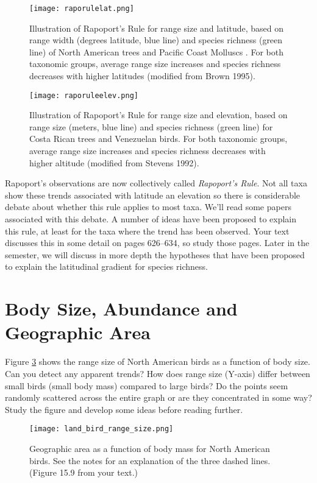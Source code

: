 \documentclass[12pt, oneside]{article}   	%
\begin{document}
\begin{figure}
	\centering
		\texttt{[image: raporulelat.png]}  
		\caption{Illustration of Rapoport's Rule for range size and latitude, based on range width (degrees latitude, blue line) and species richness (green line) of North American trees and Pacific Coast Molluscs . For both taxonomic groups, average range size increases and species richness decreases with higher latitudes (modified from Brown 1995).\label{raporulelat}}
		
\end{figure}

\begin{figure}
	\centering
		\texttt{[image: raporuleelev.png]}  
		\caption{Illustration of Rapoport's Rule for range size and elevation, based on range size (meters, blue line) and species richness (green line) for Costa Rican trees and Venezuelan birds. For both taxonomic groups, average range size increases and species richness decreases with higher altitude (modified from Stevens 1992).\label{raporuleelev}}
\end{figure}

Rapoport's observations are now collectively called \emph{Rapoport's Rule}.  Not all taxa show these trends associated with latitude an elevation so there is considerable debate about whether this rule applies to most taxa. We'll read some papers associated with this debate.  A number of ideas have been proposed to explain this rule, at least for the taxa where the trend has been observed.  Your text discusses this in some detail on pages 626--634, so study those pages.  Later in the semester, we will discuss in more depth the hypotheses that have been proposed to explain the latitudinal gradient for species richness.

\section{Body Size, Abundance and Geographic Area}

Figure \ref{areabodysize}  shows the range size of North American birds as a function of body size.  Can you detect any apparent trends? How does range size (Y-axis) differ between small birds (small body mass) compared to large birds? Do the points seem randomly scattered across the entire graph or are they concentrated in some way?  Study the figure and develop some ideas before reading further.

\begin{figure}[tb]
	\centering
		\texttt{[image: land\_bird\_range\_size.png]}
		\caption{Geographic area as a function of body mass for North American birds.  See the notes for an explanation of the three dashed lines. (Figure 15.9 from your text.)\label{areabodysize}}
\end{figure}
\end{document}
